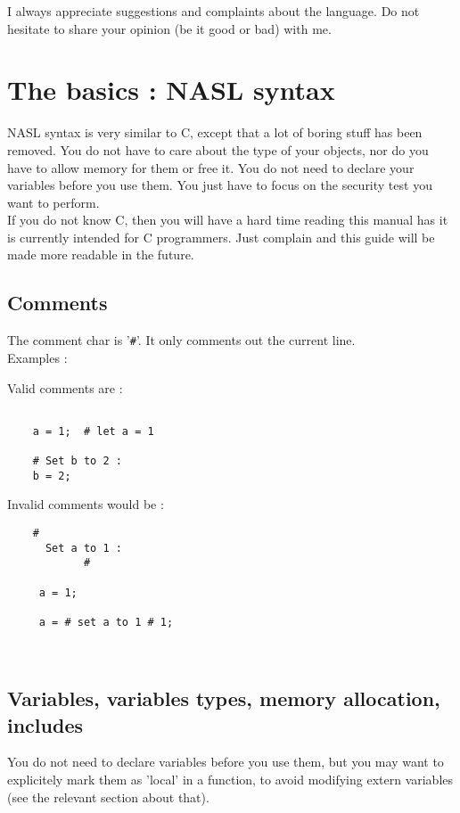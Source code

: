\documentclass{article}
\begin{document}
I always appreciate suggestions and complaints about the language. Do not
hesitate to share your opinion (be it good or bad) with me.

\newpage
\section{The basics : NASL syntax}


NASL syntax is very similar to C, except that a lot of boring stuff has
been removed. You do not have to care about the type of your objects,
nor do you have to allow memory for them or free it. You do not need to
declare your variables before you use them. You just have to focus on
the security test you want to perform.\\

If you do not know C, then you will have a hard time reading this manual
has it is currently intended for C programmers. Just complain and this guide
will be made more readable in the future.


\subsection{Comments}

  The comment char is '\verb+#+'. It only comments out the current line.\\

\noindent Examples : 
 
Valid comments are :
\begin{verbatim}    
    
 	a = 1;  # let a = 1 
	
	# Set b to 2 :
	b = 2;
\end{verbatim}	
	
	
Invalid comments would be :
\begin{verbatim}   
   	#
	  Set a to 1 :
	  		#
			
	 a = 1;
	
	 a = # set a to 1 # 1;
	 
	  		
\end{verbatim}

\subsection{Variables, variables types, memory allocation, includes}

  You do not need to declare variables before you use them, but you
  may want to explicitely mark them as 'local' in a function, to avoid
  modifying extern variables (see the relevant section about that).
 
\end{document}
